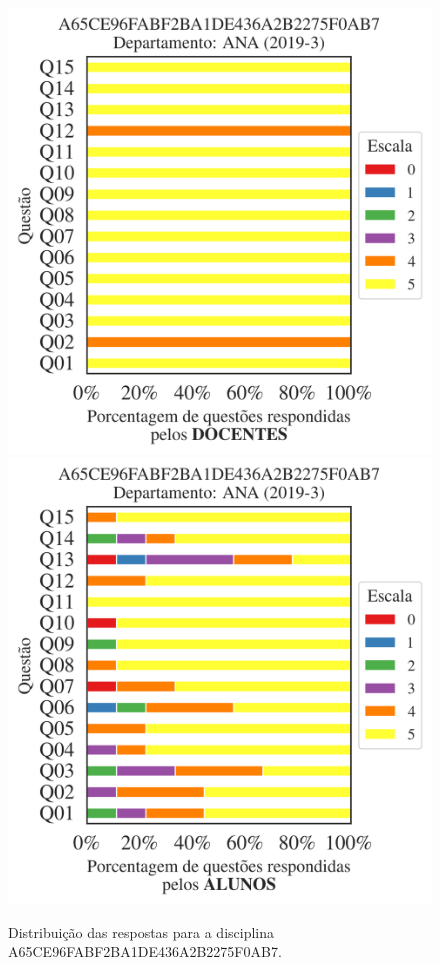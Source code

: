 \documentclass[a4paper,10pt]{article}
\begin{document}
\begin{figure}[h]
\centering
\includegraphics[width=0.485\linewidth]{analise_disciplina_departamento_ANA_A65CE96FABF2BA1DE436A2B2275F0AB7_docentes.png}
\includegraphics[width=0.485\linewidth]{analise_disciplina_departamento_ANA_A65CE96FABF2BA1DE436A2B2275F0AB7_alunos.png}
\caption{\label{fig:analise_geral_departamento}                Distribuição das respostas para a disciplina A65CE96FABF2BA1DE436A2B2275F0AB7. }
\end{figure}
\end{document}
